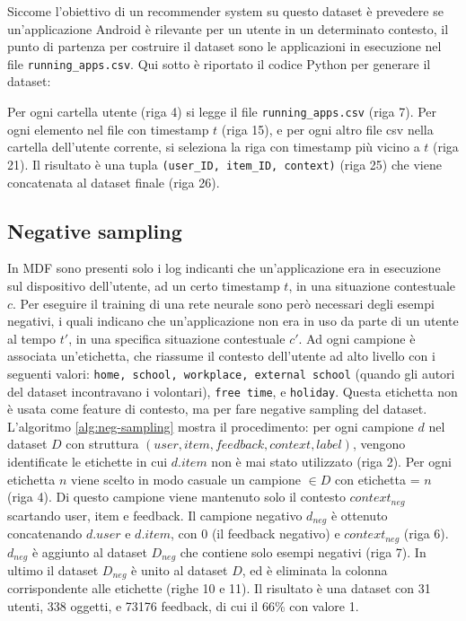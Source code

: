 \documentclass[12pt,italian]{report}
\begin{document}
Siccome l'obiettivo di un recommender system su questo dataset è prevedere se un'applicazione Android è rilevante per un utente in un determinato contesto, il punto di partenza per costruire il dataset sono le applicazioni in esecuzione nel file \texttt{running\_apps.csv}. Qui sotto è riportato il codice Python per generare il dataset: 

Per ogni cartella utente (riga 4) si legge il file \texttt{running\_apps.csv} (riga 7). Per ogni elemento nel file con timestamp $t$ (riga 15), e per ogni altro file csv nella cartella dell'utente corrente, si seleziona la riga con timestamp più vicino a $t$ (riga 21). Il risultato è una tupla \texttt{(user\_ID, item\_ID, context)} (riga 25) che viene concatenata al dataset finale (riga 26).

\subsection{Negative sampling}
In MDF sono presenti solo i log indicanti che un'applicazione era in esecuzione sul dispositivo dell'utente, ad un certo timestamp $t$, in una situazione contestuale $c$. Per eseguire il training di una rete neurale sono però necessari degli esempi negativi, i quali indicano che un'applicazione non era in uso da parte di un utente al tempo $t'$, in una specifica situazione contestuale $c'$. Ad ogni campione è associata un'etichetta, che riassume il contesto dell'utente ad alto livello con i seguenti valori: \texttt{home, school, workplace, external school} (quando gli autori del dataset incontravano i volontari), \texttt{free time}, e \texttt{holiday}. Questa etichetta non è usata come feature di contesto, ma per fare negative sampling del dataset. 
L'algoritmo \ref{alg:neg-sampling} mostra il procedimento: per ogni campione $d$ nel dataset $D$ con struttura $(user, item, feedback, context, label)$, vengono identificate le etichette in cui $d.item$ non è mai stato utilizzato (riga 2). Per ogni etichetta $n$ viene scelto in modo casuale un campione $\in D$ con etichetta = $n$ (riga 4). Di questo campione viene mantenuto solo il contesto $context_{neg}$ scartando user, item e feedback. Il campione negativo $d_{neg}$ è ottenuto concatenando $d.user$ e $d.item$, con 0 (il feedback negativo) e $context_{neg}$ (riga 6).  $d_{neg}$ è aggiunto al dataset $D_{neg}$ che contiene solo esempi negativi (riga 7). In ultimo il dataset $D_{neg}$ è unito al dataset $D$, ed è eliminata la colonna corrispondente alle etichette (righe 10 e 11). Il risultato è una dataset con 31 utenti, 338 oggetti, e 73176 feedback, di cui il 66\% con valore 1.
\end{document}
